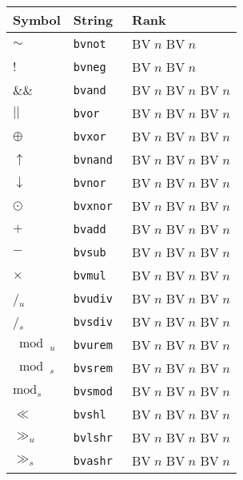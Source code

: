 \begin{table}
\centering
\begin{tabular}{lll}
\toprule
\textbf{Symbol} & \textbf{String} & \textbf{Rank} \\
\midrule
$\sim$ & \tt{bvnot} & \(\mathrm{BV}\;n\)\; \(\mathrm{BV}\;n\) \\
$!$   & \tt{bvneg} & \(\mathrm{BV}\;n\)\; \(\mathrm{BV}\;n\) \\
$\&\&$ & \tt{bvand} & \(\mathrm{BV}\;n\)\; \(\mathrm{BV}\;n\)\; \(\mathrm{BV}\;n\) \\
$||$  & \tt{bvor}  & \(\mathrm{BV}\;n\)\; \(\mathrm{BV}\;n\)\; \(\mathrm{BV}\;n\) \\
$\oplus$& \tt{bvxor} & \(\mathrm{BV}\;n\)\; \(\mathrm{BV}\;n\)\; \(\mathrm{BV}\;n\) \\
$\uparrow$ & \tt{bvnand} & \(\mathrm{BV}\;n\)\; \(\mathrm{BV}\;n\)\; \(\mathrm{BV}\;n\) \\
$\downarrow$ & \tt{bvnor}  & \(\mathrm{BV}\;n\)\; \(\mathrm{BV}\;n\)\; \(\mathrm{BV}\;n\) \\
$\odot$ & \tt{bvxnor} & \(\mathrm{BV}\;n\)\; \(\mathrm{BV}\;n\)\; \(\mathrm{BV}\;n\) \\
$+$ & \tt{bvadd} & \(\mathrm{BV}\;n\)\; \(\mathrm{BV}\;n\)\; \(\mathrm{BV}\;n\) \\
$-$ & \tt{bvsub} & \(\mathrm{BV}\;n\)\; \(\mathrm{BV}\;n\)\; \(\mathrm{BV}\;n\) \\
$\times$ & \tt{bvmul} & \(\mathrm{BV}\;n\)\; \(\mathrm{BV}\;n\)\; \(\mathrm{BV}\;n\) \\
/\(_u\) & \tt{bvudiv} & \(\mathrm{BV}\;n\)\; \(\mathrm{BV}\;n\)\; \(\mathrm{BV}\;n\) \\
/\(_s\) & \tt{bvsdiv} & \(\mathrm{BV}\;n\)\; \(\mathrm{BV}\;n\)\; \(\mathrm{BV}\;n\) \\
$\bmod_u$ & \tt{bvurem} & \(\mathrm{BV}\;n\)\; \(\mathrm{BV}\;n\)\; \(\mathrm{BV}\;n\) \\
$\bmod_s$ & \tt{bvsrem} & \(\mathrm{BV}\;n\)\; \(\mathrm{BV}\;n\)\; \(\mathrm{BV}\;n\) \\
$\mathrm{mod}_s$ & \tt{bvsmod} & \(\mathrm{BV}\;n\)\; \(\mathrm{BV}\;n\)\; \(\mathrm{BV}\;n\) \\
$\ll$ & \tt{bvshl}  & \(\mathrm{BV}\;n\)\; \(\mathrm{BV}\;n\)\; \(\mathrm{BV}\;n\) \\
$\gg_u$ & \tt{bvlshr} & \(\mathrm{BV}\;n\)\; \(\mathrm{BV}\;n\)\; \(\mathrm{BV}\;n\) \\
$\gg_s$ & \tt{bvashr} & \(\mathrm{BV}\;n\)\; \(\mathrm{BV}\;n\)\; \(\mathrm{BV}\;n\) \\

\end{tabular}
\end{table}
